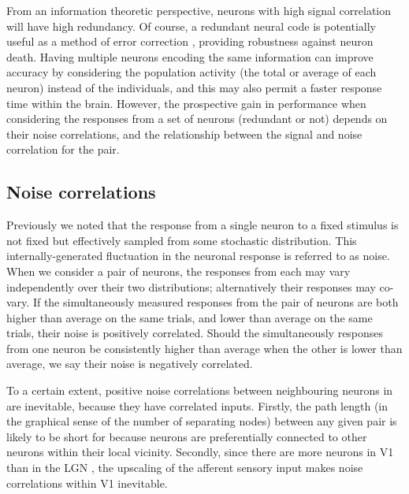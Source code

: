 From an information theoretic perspective, neurons with high signal correlation will have high redundancy.
Of course, a redundant neural code is potentially useful as a method of error correction \citep[Chapter~1]{mackay2003information}, providing robustness against neuron death.
Having multiple neurons encoding the same information can improve accuracy by considering the population activity (the total or average of each neuron) instead of the individuals, and this may also permit a faster response time within the brain.
However, the prospective gain in performance when considering the responses from a set of neurons (redundant or not) depends on their noise correlations, and the relationship between the signal and noise correlation for the pair.


\subsection{Noise correlations}
\label{sec:bg-noisecorr}

Previously we noted that the response from a single neuron to a fixed stimulus is not fixed but effectively sampled from some stochastic distribution.
This internally-generated fluctuation in the neuronal response is referred to as noise.%
When we consider a pair of neurons, the responses from each may vary independently over their two distributions; alternatively their responses may co-vary.
If the simultaneously measured responses from the pair of neurons are both higher than average on the same trials, and lower than average on the same trials, their noise is positively correlated.
Should the simultaneously responses from one neuron be consistently higher than average when the other is lower than average, we say their noise is negatively correlated.

To a certain extent, positive noise correlations between neighbouring neurons in are inevitable, because they have correlated inputs.
Firstly, the path length (in the graphical sense of the number of separating nodes) between any given pair is likely to be short for because neurons are preferentially connected to other neurons within their local vicinity.
Secondly, since there are more neurons in \ac{V1} than in the \ac{LGN} \citep{Kanitscheider2015}, the upscaling of the afferent sensory input makes noise correlations within \ac{V1} inevitable.

